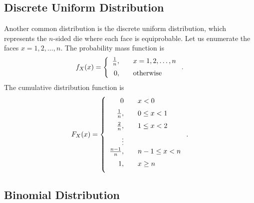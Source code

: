 \subsection{Discrete Uniform Distribution}

Another common distribution is the discrete uniform distribution, which represents the $n$-sided die where each face is equiprobable. Let us enumerate the faces $x = 1, 2, \ldots, n$. The probability mass function is
\begin{align}
  f_X(x) = \left\{ \begin{array}{r l}
  \frac{1}{n}, & \quad x = 1, 2, \ldots, n \vspace{0.2cm} \\
  0,           & \quad \text{otherwise} \\ \end{array} \right. .
\end{align}
The cumulative distribution function is
\begin{align}
  F_X(x) = \left\{ \begin{array}{r l}
  0            & \quad x < 0 \vspace{0.2cm} \\
  \frac{1}{n}, & \quad 0 \le x < 1 \vspace{0.2cm} \\
  \frac{2}{n}, & \quad 1 \le x < 2 \vspace{0.2cm} \\
  \vdots & \\
  \frac{n-1}{n}, & \quad n-1 \le x < n \vspace{0.2cm} \\
  1,     & \quad x \ge n \vspace{0.2cm}  \\ \end{array} \right. .
\end{align}

\subsection{Binomial Distribution}

